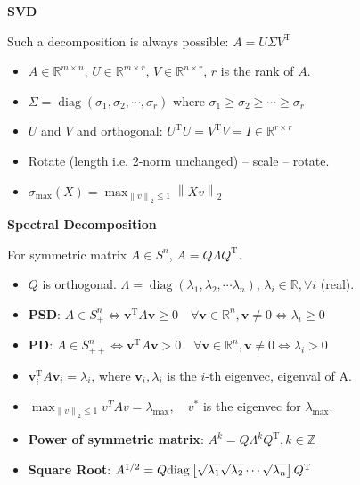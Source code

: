 {\LARGE \textbf{SVD}}

Such a decomposition is always possible:
$A=U \Sigma V^{\mathrm{T}}$
\begin{itemize}

\item $A \in \mathbb{R}^{m \times n}$, $U \in \mathbb{R}^{m \times r}$, $V \in \mathbb{R}^{n \times r}$, $r$ is the rank of $A$.
\item $\Sigma=\operatorname{diag}\left(\sigma_{1}, \sigma_{2}, \cdots, \sigma_{r}\right)$ where $\sigma_{1} \geq \sigma_{2} \geq \cdots \geq \sigma_{r}$
\item $U$ and $V$ and orthogonal: $U^{\mathrm{T}} U=V^{\mathrm{T}} V=I \in \mathbb{R}^{r \times r}$

\item Rotate (length i.e. 2-norm unchanged) -- scale -- rotate.

\item ${\sigma _{\max }}(X) = {\max _{{{\left\| v \right\|}_2} \le 1}}{\left\| {Xv} \right\|_2}$
\end{itemize}



{\LARGE \textbf{Spectral Decomposition}}

For symmetric matrix $A \in S^{n}$, $A=Q \Lambda Q^{\mathrm{T}}$.
\begin{itemize}

\item $Q$ is orthogonal. $\Lambda=\operatorname{diag}\left(\lambda_{1}, \lambda_{2}, \cdots \lambda_{n}\right)$, $\lambda_{i} \in \mathbb{R}, \forall i$ (real).
    
\item \textbf{PSD}: $A \in S_{+}^{n} \Leftrightarrow \bm{v}^{\mathrm{T}} A \bm{v} \geq 0 \quad \forall \bm{v} \in \mathbb{R}^{n}, \bm{v} \neq 0 \Leftrightarrow \lambda_{i} \geq 0$ 

\item \textbf{PD}: $A \in S_{++}^{n} \Leftrightarrow \bm{v}^{\mathrm{T}} A \bm{v} > 0 \quad \forall \bm{v} \in \mathbb{R}^{n}, \bm{v} \neq 0 \Leftrightarrow \lambda_{i} > 0$ 

\item $\bm{v}_i^{\mathrm{T}} A \bm{v}_i = \lambda_i$, where $\bm{v}_i, \lambda_i$ is the $i$-th eigenvec, eigenval of A.

\item ${{\max _{{{\left\| v \right\|}_2} \le 1}}{v^T}Av=\lambda _{\max }}, \quad v^*$ is the eigenvec for $\lambda _{\max }$. 


\item \textbf{Power of symmetric matrix}: $A^{k}=Q \Lambda^{k} Q^{\mathrm{T}}, k \in \mathbb{Z}$

\item \textbf{Square Root}: ${A^{1/2}} = Q{\mathrm{diag}}\left[ {\sqrt {{\lambda _1}} \sqrt {{\lambda _2}}  \cdots \sqrt {{\lambda _n}} } \right]{Q^{\rm{T}}}$
    
\end{itemize}


